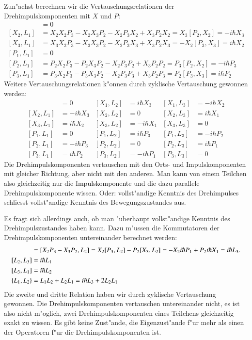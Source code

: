 Zun"achst berechnen wir die Vertauschungsrelationen der
Drehimpulskomponenten mit $X$ und $P$:
\begin{align*}
[X_1,L_1]&=0\\
[X_2,L_1]
&=
X_2X_2P_3-X_2X_3P_2-X_2P_3X_2+X_3P_2X_2
=X_3[P_2,X_2]
=-i\hbar X_3
\\
[X_3,L_1]
&=
X_3X_2P_3-X_3X_3P_2-X_2P_3X_3+X_3P_2X_3
=
-X_2[P_3,X_3]
=
i\hbar X_2
\\
[P_1,L_1]&=0\\
[P_2,L_1]
&=
P_2X_2P_3 - P_2X_3P_2 - X_2P_3P_2 + X_3P_2P_2
=
P_3[P_2,X_2]
=
-i\hbar P_3
\\
[P_3,L_1]
&=
P_3X_2P_3 - P_3X_3P_2 - X_2P_3P_3 + X_3P_2P_3
=
P_2[P_3,X_3]=i\hbar P_2
\end{align*}
Weitere Vertauschungsrelationen k"onnen durch zyklische Vertauschung
gewonnen werden:
\begin{align*}
[X_1,L_1] &= 0          & [X_1,L_2] &= i\hbar X_3 & [X_1,L_3] &=-i\hbar X_2\\
[X_2,L_1] &=-i\hbar X_3 & [X_2,L_2] &= 0          & [X_2,L_3] &= i\hbar X_1\\
[X_3,L_1] &= i\hbar X_2 & [X_3,L_2] &=-i\hbar X_1 & [X_3,L_3] &= 0         \\
[P_1,L_1] &= 0          & [P_1,L_2] &= i\hbar P_3 & [P_1,L_3] &=-i\hbar P_2\\
[P_2,L_1] &=-i\hbar P_3 & [P_2,L_2] &= 0          & [P_2,L_3] &= i\hbar P_1\\
[P_3,L_1] &= i\hbar P_2 & [P_3,L_2] &=-i\hbar P_1 & [P_3,L_3] &= 0
\end{align*}
Die Drehimpulskomponenten vertauschen mit den Orts- und Impulskomponenten
mit gleicher Richtung, aber nicht mit den anderen.
Man kann von einem Teilchen also gleichzeitig nur die Impulskomponente
und die dazu parallele Drehimpulskomponente wissen. 
Oder: vollst"andige Kenntnis des Drehimpulses schliesst vollst"andige
Kenntnis des Bewegungszustandes aus.

Es fragt sich allerdings auch, ob man "uberhaupt vollst"andige Kenntnis
des Drehimpulszustandes haben kann.
Dazu m"ussen die Kommutatoren der Drehimpulskomponenten untereinander
berechnet werden:
\begin{align}
[L_1,L_2]
&=
[X_2P_3-X_3P_2,L_2]
=
X_2[P_3,L_2]-P_2[X_3,L_2]
=
-X_2i\hbar P_1+P_2i\hbar X_1
=
i\hbar L_3.
\label{skript:drehimpulskommutator}
\\
[L_2,L_3]&=i\hbar L_1
\notag
\\
[L_3,L_1]&=i\hbar L_2
\notag
\\
\{L_1,L_2\}
&=
L_1L_2+L_2L_1=i\hbar L_3+2L_2L_1
\label{skript:drehimpulsantikommutator}
\end{align}
Die zweite und dritte Relation haben wir durch zyklische Vertauschung
gewonnen.
Die Drehimpulskomponenten vertauschen untereinander nicht, es ist also
nicht m"oglich, zwei Drehimpulskomponenten eines Teilchens
gleichzeitig exakt zu wissen.
Es gibt keine Zust"ande, die Eigenzust"ande f"ur mehr als einen
der Operatoren f"ur die Drehimpulskomponenten ist.

